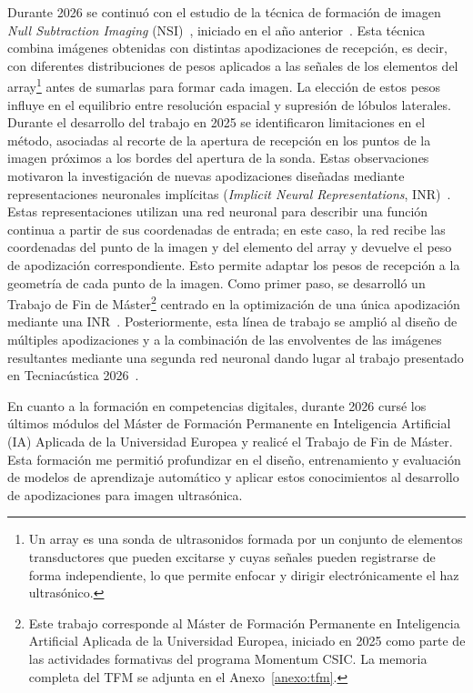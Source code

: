 \documentclass[10pt,a4paper]{article}
\begin{document}
Durante 2026 se continuó con el estudio de la técnica de formación de imagen \textit{Null Subtraction Imaging} (NSI)~\cite{Agarwal2019}, iniciado en el año anterior~\cite{CosarinskyMemoria2025}. Esta técnica combina imágenes obtenidas con distintas apodizaciones de recepción, es decir, con diferentes distribuciones de pesos aplicados a las señales de los elementos del array\footnote{Un array es una sonda de ultrasonidos formada por un conjunto de elementos transductores que pueden excitarse y cuyas señales pueden registrarse de forma independiente, lo que permite enfocar y dirigir electrónicamente el haz ultrasónico.} antes de sumarlas para formar cada imagen. La elección de estos pesos influye en el equilibrio entre resolución espacial y supresión de lóbulos laterales. Durante el desarrollo del trabajo en 2025 se identificaron limitaciones en el método, asociadas al recorte de la apertura de recepción en los puntos de la imagen próximos a los bordes del apertura de la sonda. Estas observaciones motivaron la investigación de nuevas apodizaciones diseñadas mediante representaciones neuronales implícitas (\textit{Implicit Neural Representations}, INR)~\cite{Molaei2023}. Estas representaciones utilizan una red neuronal para describir una función continua a partir de sus coordenadas de entrada; en este caso, la red recibe las coordenadas del punto de la imagen y del elemento del array y devuelve el peso de apodización correspondiente. Esto permite adaptar los pesos de recepción a la geometría de cada punto de la imagen. Como primer paso, se desarrolló un Trabajo de Fin de Máster\footnote{Este trabajo corresponde al Máster de Formación Permanente en Inteligencia Artificial Aplicada de la Universidad Europea, iniciado en 2025 como parte de las actividades formativas del programa Momentum CSIC. La memoria completa del TFM se adjunta en el Anexo~\ref{anexo:tfm}.} centrado en la optimización de una única apodización mediante una INR~\cite{CosarinskyTFM2026}. Posteriormente, esta línea de trabajo se amplió al diseño de múltiples apodizaciones y a la combinación de las envolventes de las imágenes resultantes mediante una segunda red neuronal dando lugar al trabajo presentado en Tecniacústica 2026~\cite{CosarinskyTecniacustica2026}.

En cuanto a la formación en competencias digitales, durante 2026 cursé los últimos módulos del Máster de Formación Permanente en Inteligencia Artificial (IA) Aplicada de la Universidad Europea y realicé el Trabajo de Fin de Máster. Esta formación me permitió profundizar en el diseño, entrenamiento y evaluación de modelos de aprendizaje automático y aplicar estos conocimientos al desarrollo de apodizaciones para imagen ultrasónica.
\end{document}
